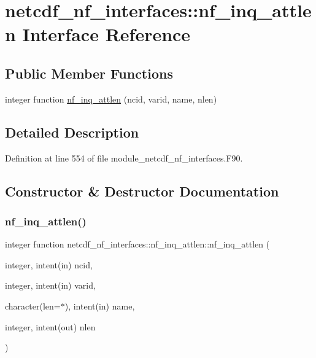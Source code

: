 \hypertarget{interfacenetcdf__nf__interfaces_1_1nf__inq__attlen}{}\section{netcdf\+\_\+nf\+\_\+interfaces\+:\+:nf\+\_\+inq\+\_\+attlen Interface Reference}
\label{interfacenetcdf__nf__interfaces_1_1nf__inq__attlen}
\subsection*{Public Member Functions}
\begin{DoxyCompactItemize}
\item 
integer function \hyperlink{interfacenetcdf__nf__interfaces_1_1nf__inq__attlen_aaf2df25ffa8e7e36710283470540e14e}{nf\+\_\+inq\+\_\+attlen} (ncid, varid, name, nlen)
\end{DoxyCompactItemize}


\subsection{Detailed Description}


Definition at line 554 of file module\+\_\+netcdf\+\_\+nf\+\_\+interfaces.\+F90.



\subsection{Constructor \& Destructor Documentation}
\mbox{\label{interfacenetcdf__nf__interfaces_1_1nf__inq__attlen_aaf2df25ffa8e7e36710283470540e14e}} 
\subsubsection{\texorpdfstring{nf\+\_\+inq\+\_\+attlen()}{nf\_inq\_attlen()}}
{\footnotesize\ttfamily integer function netcdf\+\_\+nf\+\_\+interfaces\+::nf\+\_\+inq\+\_\+attlen\+::nf\+\_\+inq\+\_\+attlen (\begin{DoxyParamCaption}\item[{integer, intent(in)}]{ncid,  }\item[{integer, intent(in)}]{varid,  }\item[{character(len=$\ast$), intent(in)}]{name,  }\item[{integer, intent(out)}]{nlen }\end{DoxyParamCaption})}



